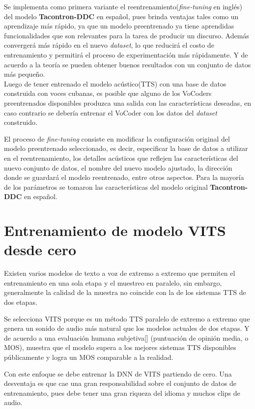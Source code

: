 Se implementa como primera variante el reentrenamiento(\textit{fine-tuning} en inglés) del modelo \textbf{Tacontron-DDC} en español, pues brinda ventajas tales como un aprendizaje más rápido, ya que un modelo preentrenado ya tiene aprendidas funcionalidades que son relevantes para la tarea de producir un discurso. Además convergerá más rápido en el nuevo \textit{dataset}, lo que reducirá el costo de entrenamiento y permitirá el proceso de experimentación más rápidamente. Y de acuerdo a la teoría se pueden obtener buenos resultados con un conjunto de datos más pequeño.\\

Luego de tener entrenado el modelo acústico(TTS) con una base de datos construida con voces cubanas, es posible que alguno de los VoCoders preentrenados disponibles produzca una salida con las características deseadas, en caso contrario se debería entrenar el VoCoder con los datos del \textit{dataset} construido.


El proceso de \textit{fine-tuning} consiste en modificar la configuración original del modelo preentrenado seleccionado, es decir, especificar la base de datos a utilizar en el reentrenamiento, los detalles acústicos que reflejen las características del nuevo conjunto de datos, el nombre del nuevo modelo ajustado, la dirección donde se guardará el modelo reentrenado, entre otros aspectos. Para la mayoría de los parámetros se tomaron las características del modelo original \textbf{Tacontron-DDC} en español.


\section{Entrenamiento de modelo VITS desde cero} \label{vits-sandra}

Existen varios modelos de texto a voz de extremo a extremo que permiten el entrenamiento en una sola etapa y el muestreo en paralelo, sin embargo, generalmente la calidad de la muestra no coincide con la de los sistemas TTS de dos etapas. 

Se selecciona VITS porque es un método TTS paralelo de extremo a extremo que genera un sonido de audio más natural que los modelos actuales de dos etapas. Y de acuerdo a una evaluación humana subjetiva[\cite{mos}] (puntuación de opinión media, o MOS), muestra que el modelo supera a los mejores sistemas TTS disponibles públicamente y logra un MOS comparable a la realidad.

Con este enfoque se debe entrenar la DNN de VITS partiendo de cero. Una desventaja es que cae una gran responsabilidad sobre el conjunto de datos de entrenamiento, pues debe tener una gran riqueza del idioma y muchos clips de audio.
	
